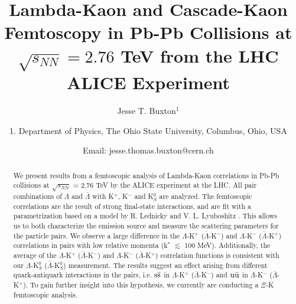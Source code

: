 \documentclass[ALICE,manyauthors]{ALICE_analysis_notes}
\begin{document}
%
%
%
\begin{titlepage}
%
\PHdate{\today}
%
\title{Lambda-Kaon and Cascade-Kaon Femtoscopy in Pb-Pb Collisions at $\sqrt{s_{NN}}=2.76$ TeV from the LHC ALICE Experiment}
%
\author{Jesse T. Buxton$^{1}$}
\author{
1. Department of Physics, The Ohio State University, Columbus, Ohio, USA\\
}
\author{Email: jesse.thomas.buxton@cern.ch}
%
%
\begin{abstract}

\begin{comment}
My abstract will be contained here.  The abstract will introduce my study and inform the reader about the content of this paper.  I will state the problem I tackle, and summarize (in one sentence) why no one else has yet to adequately answered the research question.  Next, I will explain (again, in one sentence) how I tackled the research question, and (in one sentence) how I went about doing the research which followed from this big idea (i.e. elaborate on previous sentence).  Finally, as a single sentence, I will state the key impact of my research.
\end{comment}

We present results from a femtoscopic analysis of Lambda-Kaon correlations in Pb-Pb collisions at $\sqrt{s_{NN}}$ = 2.76 TeV by the ALICE experiment at the LHC.  
All pair combinations of $\Lambda$ and $\bar{\Lambda}$ with K$^{+}$, K$^{-}$ and K$^{0}_{S}$ are analyzed.  
The femtoscopic correlations are the result of strong final-state interactions, and are fit with a parametrization based on a model by R. Lednicky and V. L. Lyuboshitz \cite{Lednicky:82}.  
This allows us to both characterize the emission source and measure the scattering parameters for the particle pairs.  
We observe a large difference in the $\Lambda$-K$^{+}$ ($\bar{\Lambda}$-K$^{-}$) and $\Lambda$-K$^{-}$ ($\bar{\Lambda}$-K$^{+}$) correlations in pairs with low relative momenta (k$^{*}$ $\lesssim$ 100 MeV).  
Additionally, the average of the $\Lambda$-K$^{+}$ ($\bar{\Lambda}$-K$^{-}$) and $\Lambda$-K$^{-}$ ($\bar{\Lambda}$-K$^{+}$) correlation functions is consistent with our $\Lambda$-K$^{0}_{S}$ ($\bar{\Lambda}$-K$^{0}_{S}$) measurement.  
The results suggest an effect arising from different quark-antiquark interactions in the pairs, i.e. $\rm s\bar{s}$ in $\Lambda$-K$^{+}$ ($\bar{\Lambda}$-K$^{-}$) and $\rm u\bar{u}$ in $\Lambda$-K$^{-}$ ($\bar{\Lambda}$-K$^{+}$).  
To gain further insight into this hypothesis, we currently are conducting a $\Xi$-K femtoscopic analysis.
\end{abstract}
\end{titlepage}
%
%




\end{document}
